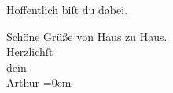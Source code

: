 \pstart
           Hoffentlich biſt du dabei.\pend
           
\pstart
           Schöne Grüße von Haus zu Haus.{\\[\baselineskip]}Herzlichſt{\\[\baselineskip]}dein{\\[\baselineskip]}\spacefill\mbox{Arthur}\pend
           \leftskip=0em{}\endnumbering{}  \newcommand{\dateiname}{L01967}\newcommand{\titel}{Arthur Schnitzler an Hermann Bahr, 20. 10. 1910}\newcommand{\editorInnen}{Herausgegeben von Martin Anton Müller}
